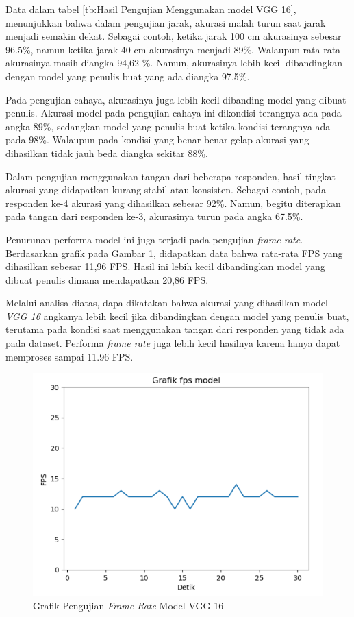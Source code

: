 Data dalam tabel \ref{tb:Hasil Pengujian Menggunakan model VGG 16}, menunjukkan bahwa dalam pengujian jarak, akurasi malah turun saat jarak menjadi semakin dekat. Sebagai contoh, ketika jarak 100 cm akurasinya sebesar 96.5\%, namun ketika jarak 40 cm akurasinya menjadi 89\%. Walaupun rata-rata akurasinya masih diangka 94,62 \%. Namun, akurasinya lebih kecil dibandingkan dengan model yang penulis buat yang ada diangka 97.5\%.

Pada pengujian cahaya, akurasinya juga lebih kecil dibanding model yang dibuat penulis. Akurasi model pada pengujian cahaya ini dikondisi terangnya ada pada angka 89\%, sedangkan model yang penulis buat ketika kondisi terangnya ada pada 98\%. Walaupun pada kondisi yang benar-benar gelap akurasi yang dihasilkan tidak jauh beda diangka sekitar 88\%.

Dalam pengujian menggunakan tangan dari beberapa responden, hasil tingkat akurasi yang didapatkan kurang stabil atau konsisten. Sebagai contoh, pada responden ke-4 akurasi yang dihasilkan sebesar 92\%. Namun, begitu diterapkan pada tangan dari responden ke-3, akurasinya turun pada angka 67.5\%.

Penurunan performa model ini juga terjadi pada pengujian \emph{frame rate}. Berdasarkan grafik pada Gambar \ref{fig:Grafik Pengujian Frame Rate Model VGG 16}, didapatkan data bahwa rata-rata FPS yang dihasilkan sebesar 11,96 FPS. Hasil ini lebih kecil dibandingkan model yang dibuat penulis dimana mendapatkan 20,86 FPS.

Melalui analisa diatas, dapa dikatakan bahwa akurasi yang dihasilkan model \emph{VGG 16} angkanya lebih kecil jika dibandingkan dengan model yang penulis buat, terutama pada kondisi saat menggunakan tangan dari responden yang tidak ada pada dataset. Performa \emph{frame rate} juga lebih kecil hasilnya karena hanya dapat memproses sampai 11.96 FPS.
\newpage

\begin{figure}[!htb]
  \centering
  \includegraphics[scale=0.8]{gambar/pengujian-fps/grafik-pengujian-fps-vgg16.png}
  \caption{Grafik Pengujian \emph{Frame Rate} Model VGG 16}
  \label{fig:Grafik Pengujian Frame Rate Model VGG 16}
\end{figure}

